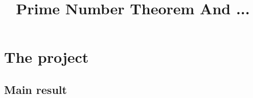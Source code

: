 \documentclass{report}
\title{Prime Number Theorem And ...}
\theoremstyle{definition}
\begin{document}
\maketitle

\chapter{The project}

\section{Main result}




\end{document}
